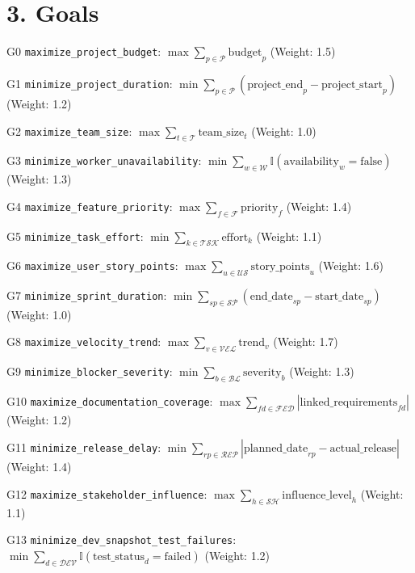 \documentclass[12pt]{article}
\begin{document}
\section{3. Goals}
\item[G0] \texttt{maximize\_project\_budget}: $\max \sum_{p \in \mathcal{P}} \text{budget}_p$ \hfill (Weight: 1.5)
    \item[G1] \texttt{minimize\_project\_duration}: $\min \sum_{p \in \mathcal{P}} (\text{project\_end}_p - \text{project\_start}_p)$ \hfill (Weight: 1.2)
    \item[G2] \texttt{maximize\_team\_size}: $\max \sum_{t \in \mathcal{T}} \text{team\_size}_t$ \hfill (Weight: 1.0)
    \item[G3] \texttt{minimize\_worker\_unavailability}: $\min \sum_{w \in \mathcal{W}} \mathbb{I}(\text{availability}_w = \text{false})$ \hfill (Weight: 1.3)
    \item[G4] \texttt{maximize\_feature\_priority}: $\max \sum_{f \in \mathcal{F}} \text{priority}_f$ \hfill (Weight: 1.4)
    \item[G5] \texttt{minimize\_task\_effort}: $\min \sum_{k \in \mathcal{TSK}} \text{effort}_k$ \hfill (Weight: 1.1)
    \item[G6] \texttt{maximize\_user\_story\_points}: $\max \sum_{u \in \mathcal{US}} \text{story\_points}_u$ \hfill (Weight: 1.6)
    \item[G7] \texttt{minimize\_sprint\_duration}: $\min \sum_{sp \in \mathcal{SP}} (\text{end\_date}_{sp} - \text{start\_date}_{sp})$ \hfill (Weight: 1.0)
    \item[G8] \texttt{maximize\_velocity\_trend}: $\max \sum_{v \in \mathcal{VEL}} \text{trend}_v$ \hfill (Weight: 1.7)
    \item[G9] \texttt{minimize\_blocker\_severity}: $\min \sum_{b \in \mathcal{BL}} \text{severity}_b$ \hfill (Weight: 1.3)
    \item[G10] \texttt{maximize\_documentation\_coverage}: $\max \sum_{fd \in \mathcal{FED}} |\text{linked\_requirements}_{fd}|$ \hfill (Weight: 1.2)
    \item[G11] \texttt{minimize\_release\_delay}: $\min \sum_{rp \in \mathcal{REP}} |\text{planned\_date}_{rp} - \text{actual\_release}|$ \hfill (Weight: 1.4)
    \item[G12] \texttt{maximize\_stakeholder\_influence}: $\max \sum_{h \in \mathcal{SH}} \text{influence\_level}_h$ \hfill (Weight: 1.1)
    \item[G13] \texttt{minimize\_dev\_snapshot\_test\_failures}: $\min \sum_{d \in \mathcal{DEV}} \mathbb{I}(\text{test\_status}_d = \text{failed})$ \hfill (Weight: 1.2)
\end{document}
